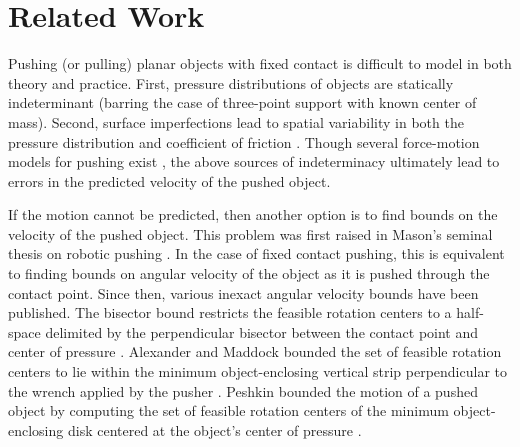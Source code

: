 \documentclass[conference]{IEEEtran}
\begin{document}

\section{Related Work}\label{sec:related-work}

Pushing (or pulling) planar objects with fixed contact is difficult to
model in both theory and practice. First, pressure distributions of
objects are statically indeterminant (barring the case of three-point
support with known center of mass). Second, surface imperfections lead
to spatial variability in both the pressure distribution and
coefficient of friction \cite{YuBFR16}. Though several force-motion
models for pushing exist
\cite{zhou2016convex,howe1996practical,goyal1991planar}, the above
sources of indeterminacy ultimately lead to errors in the predicted
velocity of the pushed object.

If the motion cannot be predicted, then another option is to find
bounds on the velocity of the pushed object. This problem was first
raised in Mason's seminal thesis on robotic pushing
\cite{Mason1982}. In the case of fixed contact pushing, this is
equivalent to finding bounds on angular velocity of the object as it
is pushed through the contact point.
Since then, various inexact angular velocity bounds have been
published. The bisector bound restricts the feasible rotation centers
to a half-space delimited by the perpendicular bisector between the
contact point and center of pressure \cite{Mason}.  Alexander and
Maddock bounded the set of feasible rotation centers to lie within the
minimum object-enclosing vertical strip perpendicular to the wrench
applied by the pusher \cite{alexander1993bounds}.  Peshkin bounded the
motion of a pushed object by computing the set of feasible rotation
centers of the minimum object-enclosing disk centered at the object's
center of pressure \cite{peshkin1988motion}.
\end{document}
